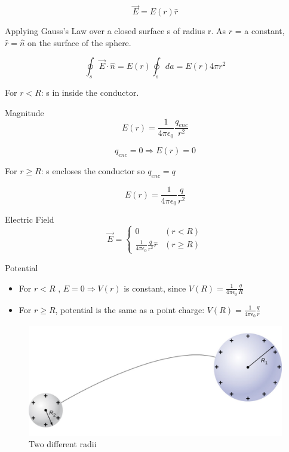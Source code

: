 \documentclass[14pt]{memoir}
\begin{document}
\begin{equation}
\vec{E} = E(r) \hat{r} 
\end{equation}

Applying Gauss's Law over a closed surface s of radius r. As $r$ = a constant, $\hat{r} = \hat{n}$ on the surface of the sphere. 

\begin{equation}
\oint_s \vec{E} \cdot \hat{n} = E(r) \oint_s da = E(r) 4 \pi r^2
\end{equation} 

For $r < R$: s in inside the conductor.

Magnitude
\begin{equation}
E(r) = \frac{1}{4 \pi \epsilon_0} \frac{q_{enc}}{r^2}
\end{equation}

\begin{equation}
q_{enc} = 0 \Rightarrow E(r) = 0
\end{equation}

For $r \geq R$: s encloses the conductor so $q_{enc} = q$

\begin{equation}
E(r) = \frac{1}{4 \pi \epsilon_0} \frac{q}{r^2}
\end{equation}

Electric Field
\begin{equation}
  \vec{E} =\begin{cases}
    0 & (r < R)\\
    \frac{1}{4 \pi \epsilon_0} \frac{q}{r^2} \hat{r} & (r \geq R)
  \end{cases}
\end{equation}

Potential 
\begin{itemize}
\item For $r < R$ , $E = 0 \Rightarrow V(r)$ is constant, since $V(R) = \frac{1}{4 \pi \epsilon_0} \frac{q}{R}$


\item For $r \geq R$, potential is the same as a point charge: $V(R) = \frac{1}{4 \pi \epsilon_0} \frac{q}{r}$
\end{itemize}


\begin{figure}[H]
\begin{center}
\includegraphics[scale=0.50]{fig/fig_07_39.jpg}
\caption{Two different radii}
\label{fig:07_39}
\end{center}
\end{figure}
\end{document}
